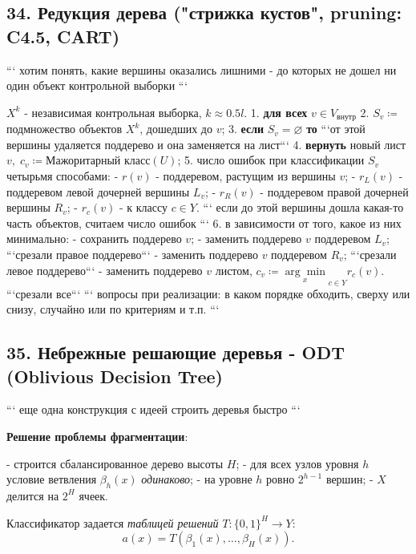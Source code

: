\subsection{34. Редукция дерева ("стрижка кустов", pruning: C4.5, CART)}

```
хотим понять, какие вершины оказались лишними - до которых не дошел ни один
объект контрольной выборки
```

$X^k$ - независимая контрольная выборка, $k \approx 0.5l$.
1. \textbf{для всех} $v \in V_{\text{внутр}}$
2. $S_v \coloneqq$ подмножество объектов $X^k$, дошедших до $v$;
3. \textbf{если} $S_v = \varnothing$ \textbf{то} ```от этой вершины удаляется поддерево и она заменяется на лист```
4. \textbf{вернуть} новый лист $v, \; c_v \coloneqq \text{Мажоритарный класс}{\left( U \right)}$;
5. число ошибок при классификации $S_v$ четырьмя способами:
    - $r{(v)}$ - поддеревом, растущим из вершины $v$;
    - $r_L{(v)}$ - поддеревом левой дочерней вершины $L_v$;
    - $r_R{(v)}$ - поддеревом правой дочерней вершины $R_v$;
    - $r_c{(v)}$ - к классу $c \in Y$.
```
если до этой вершины дошла какая-то часть объектов, считаем число ошибок
```
6. в зависимости от того, какое из них минимально:
    - сохранить поддерево $v$;
    - заменить поддерево $v$ поддеревом $L_v$; ```срезали правое поддерево```
    - заменить поддерево $v$ поддеревом $R_v$; ```срезали левое поддерево```
    - заменить поддерево $v$ листом, $\displaystyle c_v \coloneqq {\underset{x}{\arg\min}}_{c \in Y}{r_c{\left( v \right)}}$. ```срезали все```
```
вопросы при реализации: в каком порядке обходить, сверху или снизу, случайно
или по критериям и т.п.
```

\subsection{35. Небрежные решающие деревья - ODT (Oblivious Decision Tree)}

```
еще одна конструкция с идеей строить деревья быстро
```

\textbf{Решение проблемы фрагментации}:

- строится сбалансированное дерево высоты $H$;
- для всех узлов уровня $h$ условие ветвления $\beta_h{(x)}$ \textit{одинаково};
- на уровне $h$ ровно $2^{h-1}$ вершин;
- $X$ делится на $2^H$ ячеек.

Классификатор задается \textit{таблицей решений}
$T : {\lbrace 0, 1 \rbrace}^H \rightarrow Y$:
$$a{(x)} = T{\left( \beta_1{(x)}, \ldots, \beta_H{(x)} \right)}.$$


